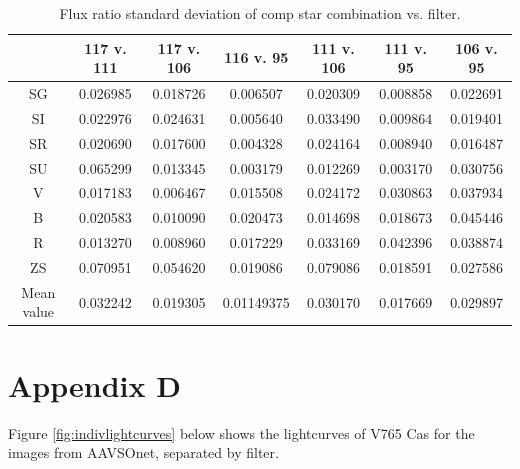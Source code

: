 \documentclass[linenumbers]{aastex631}
\begin{document}
\begin{table}[H]
    \centering
    \begin{tabular}{ | c || c | c | c | c | c | c | }
    \hline
        {} & 117 v. 111 & 117 v. 106 & 116 v. 95 & 111 v. 106 & 111 v. 95 & 106 v. 95 \\ \hline \hline
        SG & 0.026985 & 0.018726 & 0.006507 & 0.020309 & 0.008858 & 0.022691 \\ \hline
        SI & 0.022976 & 0.024631 & 0.005640 & 0.033490 & 0.009864 & 0.019401 \\ \hline
        SR & 0.020690 & 0.017600 & 0.004328 & 0.024164 & 0.008940 & 0.016487 \\ \hline
        SU & 0.065299 & 0.013345 & 0.003179 & 0.012269 & 0.003170 & 0.030756 \\ \hline
        V & 0.017183 & 0.006467 & 0.015508 & 0.024172 & 0.030863 & 0.037934 \\ \hline
        B & 0.020583 & 0.010090 & 0.020473 & 0.014698 & 0.018673 & 0.045446 \\ \hline
        R & 0.013270 & 0.008960 & 0.017229 & 0.033169 & 0.042396 & 0.038874 \\ \hline
        ZS & 0.070951 & 0.054620 & 0.019086 & 0.079086 & 0.018591 & 0.027586 \\ \hline \hline 
        Mean value & 0.032242 & 0.019305 & 0.01149375 & 0.030170 & 0.017669 & 0.029897 \\ \hline
    \end{tabular}
    \caption{Flux ratio standard deviation of comp star combination vs. filter.}
    \label{tab:stdevfluxcomps}
\end{table}

\section{Appendix D} \label{appd}
Figure \ref{fig:indivlightcurves} below shows the lightcurves of V765 Cas for the images from AAVSOnet, separated by filter.
\end{document}
